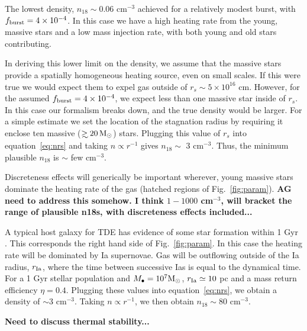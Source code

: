 \documentclass[usenatbib,fleqn]{mnras}
\newcommand\gsim{\mathrel{\rlap{\lower4pt\hbox{\hskip1pt$\sim$}}
    \raise1pt\hbox{$>$}}}
\newcommand{\Mbh}[1][]{M_{\bullet#1}}
\newcommand{\Msun}{{\rm M_\odot}}
\begin{document}
The lowest density, $n_{18}\sim 0.06$ cm$^{-3}$ achieved for a
relatively modest burst, with $f_{\rm burst}=4\times 10^{-4}$. In this
case we have a high heating rate from the young, massive stars and a
low mass injection rate, with both young and old stars contributing.

In deriving this lower limit on the density, we assume that the
massive stars provide a spatially homogeneous heating source, even on
small scales. If this were true we would expect them to expel gas
outside of $r_s \sim 5\times 10^{16}$ cm. However, for the assumed
$f_{\rm burst}=4\times 10^{-4}$, we expect less than one massive star
inside of $r_s$.  In this case our formalism breaks down, and the true
density would be larger. For a simple estimate we set the location of
the stagnation radius by requiring it enclose ten massive ($\gsim 20
\, \Msun$) stars. Plugging this value of $r_s$ into
equation~\eqref{eq:nrs} and taking $n\propto r^{-1}$ gives $n_{18}
\sim$ 3 cm$^{-3}$. Thus, the minimum plausible $n_{18}$ is $\sim$ few
cm$^{-3}$.

Discreteness effects will generically be important wherever, young
massive stars dominate the heating rate of the gas (hatched regions of
Fig.~\ref{fig:param}). {\bf AG need to address this somehow. I think
  $1-1000$ cm$^{-3}$, will bracket the range of plausible
  n18s, with discreteness effects included...}


A typical host galaxy for TDE has evidence of some star formation
within 1 Gyr \citep{French+2016}. This corresponds the right hand side
of Fig.~\ref{fig:param}. In this case the heating rate will be
dominated by Ia supernovae. Gas will be outflowing outside of the Ia
radius, $r_{\rm Ia}$, where the time between successive Ias is equal to
the dynamical time. For a 1 Gyr stellar population and $\Mbh=10^7
\Msun$, $r_{\rm Ia}\simeq 10$ pc and a mass return efficiency
$\eta=0.4$. Plugging these values into equation~\eqref{eq:nrs}, we obtain a
density of $\sim 3$ cm$^{-3}$. Taking $n\propto r^{-1}$, we then
obtain $n_{18}\sim 80$ cm$^{-3}$.

{\bf Need to discuss thermal stability...}


\end{document}
